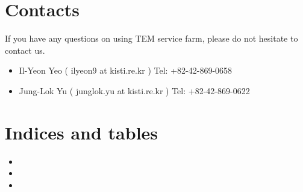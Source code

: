 \documentclass[letterpaper,10pt,english]{sphinxmanual}
\begin{document}
\chapter{Contacts}
\label{\detokenize{contact:contacts}}\label{\detokenize{contact::doc}}
If you have any questions on using TEM service farm, please do not hesitate to contact us.
\begin{itemize}
\item {} 
Il-Yeon Yeo ( ilyeon9 at kisti.re.kr ) Tel: +82-42-869-0658

\item {} 
Jung-Lok Yu ( junglok.yu at kisti.re.kr ) Tel: +82-42-869-0622

\end{itemize}


\chapter{Indices and tables}
\label{\detokenize{index:indices-and-tables}}\begin{itemize}
\item {} 

\item {} 

\item {} 

\end{itemize}



\renewcommand{\indexname}{Index}
\printindex
\end{document}
